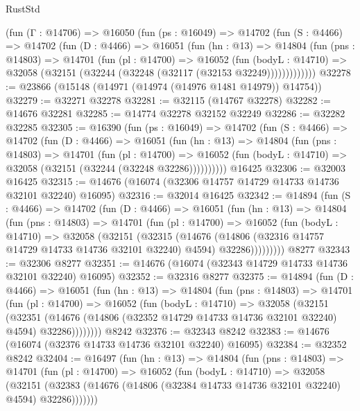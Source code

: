 \begin{lexlean}{RustStd}
\begin{coremodule}
    (fun (Γ : @14706) =>
    @16050
      (fun (ps : @16049) =>
      @14702
        (fun (S : @4466) =>
        @14702
          (fun (D : @4466) =>
          @16051
            (fun (hn : @13) =>
            @14804
              (fun (pns : @14803) =>
              @14701
                (fun (pl : @14700) =>
                @16052
                  (fun (bodyL : @14710) =>
                  @32058 (@32151 (@32244 (@32248 (@32117 (@32153 @32249)))))))))))))
@32278 := @23866 (@15148 (@14971 (@14974 (@14976 @1481 @14979)) @14754))
@32279 := @32271 @32278
@32281 := @32115 (@14767 @32278)
@32282 := @14676 @32281
@32285 := @14774 @32278 @32152 @32249
@32286 := @32282 @32285
@32305 := @16390
    (fun (ps : @16049) =>
    @14702
      (fun (S : @4466) =>
      @14702
        (fun (D : @4466) =>
        @16051
          (fun (hn : @13) =>
          @14804
            (fun (pns : @14803) =>
            @14701
              (fun (pl : @14700) =>
              @16052 (fun (bodyL : @14710) => @32058 (@32151 (@32244 (@32248 @32286))))))))))
    @16425
@32306 := @32003 @16425
@32315 := @14676 (@16074 (@32306 @14757 @14729 @14733 @14736 @32101 @32240) @16095)
@32316 := @32014 @16425
@32342 := @14894
    (fun (S : @4466) =>
    @14702
      (fun (D : @4466) =>
      @16051
        (fun (hn : @13) =>
        @14804
          (fun (pns : @14803) =>
          @14701
            (fun (pl : @14700) =>
            @16052
              (fun (bodyL : @14710) =>
              @32058
                (@32151
                  (@32315
                    (@14676
                      (@14806 (@32316 @14757 @14729 @14733 @14736 @32101 @32240) @4594)
                      @32286)))))))))
    @8277
@32343 := @32306 @8277
@32351 := @14676 (@16074 (@32343 @14729 @14733 @14736 @32101 @32240) @16095)
@32352 := @32316 @8277
@32375 := @14894
    (fun (D : @4466) =>
    @16051
      (fun (hn : @13) =>
      @14804
        (fun (pns : @14803) =>
        @14701
          (fun (pl : @14700) =>
          @16052
            (fun (bodyL : @14710) =>
            @32058
              (@32151
                (@32351
                  (@14676 (@14806 (@32352 @14729 @14733 @14736 @32101 @32240) @4594) @32286))))))))
    @8242
@32376 := @32343 @8242
@32383 := @14676 (@16074 (@32376 @14733 @14736 @32101 @32240) @16095)
@32384 := @32352 @8242
@32404 := @16497
    (fun (hn : @13) =>
    @14804
      (fun (pns : @14803) =>
      @14701
        (fun (pl : @14700) =>
        @16052
          (fun (bodyL : @14710) =>
          @32058
            (@32151
              (@32383 (@14676 (@14806 (@32384 @14733 @14736 @32101 @32240) @4594) @32286)))))))

\end{coremodule}
\end{lexlean}

